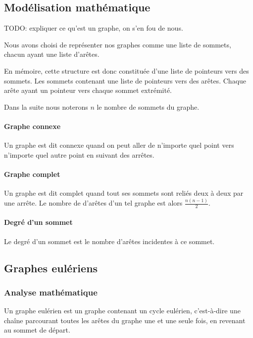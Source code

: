 \subsection{Modélisation mathématique}
  TODO: expliquer ce qu'est un graphe, on s'en fou de nous.

  Nous avons choisi de représenter nos graphes comme une liste de sommets,
  chacun ayant une liste d'arêtes.

  En mémoire, cette structure est donc constituée d'une liste de pointeurs
  vers des sommets. Les sommets contenant une liste de pointeurs vers des
  arêtes. Chaque arête ayant un pointeur vers chaque sommet extrémité.

  Dans la suite nous noterons $n$ le nombre de sommets du graphe.

  \paragraph{Graphe connexe} Un graphe est dit connexe quand on peut aller de
  n'importe quel point vers n'importe quel autre point en suivant des arrêtes.

  \paragraph{Graphe complet} Un graphe est dit complet quand tout
  ses sommets sont reliés deux à deux par une arrête. Le nombre de d'arêtes
  d'un tel graphe est alors $\frac {n(n-1)} 2$.

  \paragraph{Degré d'un sommet} Le degré d'un sommet est le nombre d'arêtes
  incidentes à ce sommet.

\subsection{Graphes eulériens}
  \subsubsection{Analyse mathématique}
    Un graphe eulérien est un graphe contenant un cycle eulérien, c'est-à-dire
    une chaîne parcourant toutes les arêtes du graphe une et une seule fois, en
    revenant au sommet de départ.
    
